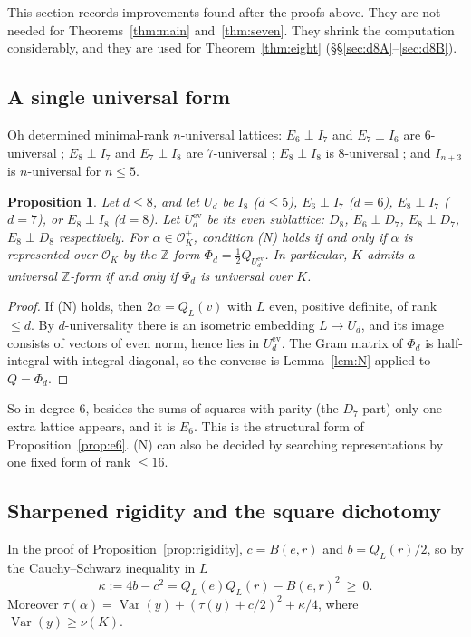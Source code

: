 \documentclass[11pt]{amsart}
\newtheorem{proposition}[theorem]{Proposition}
\theoremstyle{definition}
\DeclareMathOperator{\Var}{Var}
\newcommand{\OK}{\mathcal{O}_K}
\newcommand{\Z}{\mathbb{Z}}
\begin{document}
This section records improvements found after the proofs above.  They are not needed for
Theorems~\ref{thm:main} and~\ref{thm:seven}.  They shrink the computation considerably, and
they are used for Theorem~\ref{thm:eight} (\S\S\ref{sec:d8A}--\ref{sec:d8B}).

\subsection{A single universal form}
Oh \cite{Oh} determined minimal-rank $n$-universal lattices: $E_6\perp I_7$ and $E_7\perp I_6$
are $6$-universal \cite[Thms.~2.3, 2.5]{Oh}; $E_8\perp I_7$ and $E_7\perp I_8$ are
$7$-universal \cite[Cor.~3.2, Thm.~3.3]{Oh}; $E_8\perp I_8$ is $8$-universal
\cite[Thm.~3.1]{Oh}; and $I_{n+3}$ is $n$-universal for $n\le5$.

\begin{proposition}\label{prop:oh}
Let $d\le8$, and let $U_d$ be $I_8$ ($d\le5$), $E_6\perp I_7$ ($d=6$), $E_8\perp I_7$ ($d=7$),
or $E_8\perp I_8$ ($d=8$).  Let $U_d^{\mathrm{ev}}$ be its even sublattice: $D_8$, $E_6\perp D_7$,
$E_8\perp D_7$, $E_8\perp D_8$ respectively.  For $\alpha\in\OK^+$, condition (N) holds if and
only if $\alpha$ is represented over $\OK$ by the $\Z$-form $\Phi_d=\frac12Q_{U_d^{\mathrm{ev}}}$.  In
particular, $K$ admits a universal $\Z$-form if and only if $\Phi_d$ is universal over $K$.
\end{proposition}

\begin{proof}
If (N) holds, then $2\alpha=Q_L(v)$ with $L$ even, positive definite, of rank $\le d$.  By
$d$-universality there is an isometric embedding $L\to U_d$, and its image consists of vectors
of even norm, hence lies in $U_d^{\mathrm{ev}}$.  The Gram matrix of $\Phi_d$ is half-integral with
integral diagonal, so the converse is Lemma~\ref{lem:N} applied to $Q=\Phi_d$.
\end{proof}

So in degree $6$, besides the sums of squares with parity (the $D_7$ part) only one extra
lattice appears, and it is $E_6$.  This is the structural form of
Proposition~\ref{prop:e6}.  (N) can also be decided by searching representations by one fixed
form of rank $\le 16$.

\subsection{Sharpened rigidity and the square dichotomy}
In the proof of Proposition~\ref{prop:rigidity}, $c=B(e,r)$ and $b=Q_L(r)/2$, so by the
Cauchy--Schwarz inequality in $L$
\[
\kappa:=4b-c^2=Q_L(e)Q_L(r)-B(e,r)^2\ \ge\ 0 .
\]
Moreover $\tau(\alpha)=\Var(y)+(\tau(y)+c/2)^2+\kappa/4$, where $\Var(y)\ge\nu(K)$.
\end{document}

